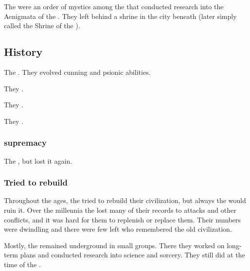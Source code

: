 \subsubsection{\UzulKaya}
The \UzulKaya were an order of mystics among the \ophidians that conducted research into the Aenigmata of the \xss. 
They left behind a shrine in the city beneath \Yormis (later simply called the Shrine of the \UzulKaya). 









\subsection{History}

The \ophidians{} . 
They evolved cunning and psionic abilities. 

They . 

They . 

They . 





\subsubsection{\QuilJaaran supremacy}
The \quiljaaran {}, but lost it again. 





\subsubsection{Tried to rebuild}
Throughout the ages, the \ophidians tried to rebuild their civilization, but always the  would ruin it.
Over the millennia the \ophidians lost many of their records to \noggyal attacks and other conflicts, and it was hard for them to replenish or replace them.
Their numbers were dwindling and there were few left who remembered the old \ophidian civilization. 

Mostly, the \ophidians remained underground in small groups.
There they worked on long-term plans and conducted research into science and sorcery. 
They still did at the time of the \thirdbanewar. 

